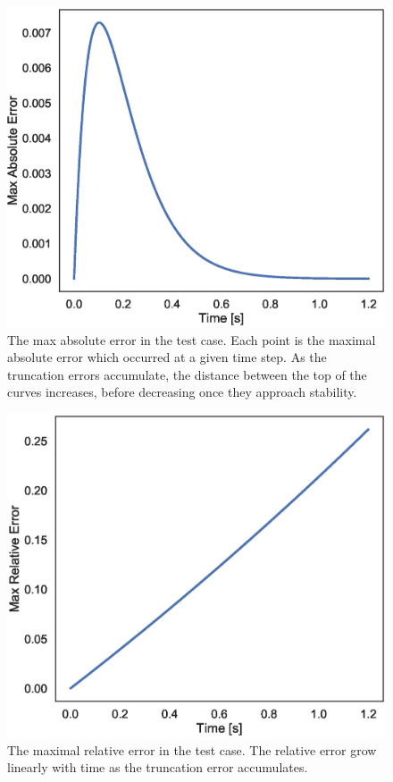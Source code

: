 \documentclass[aps,reprint]{revtex4-1}
\begin{document}
\begin{figure}[ht]
  \centering
  \includegraphics[width=\columnwidth]{figures/sin_absolute_error.eps}
  \caption{\label{fig:sinabserr} The max absolute error in the test case. Each
    point is the maximal absolute error which occurred at a given time step.
    As the truncation errors accumulate, the distance between the top of the
    curves increases, before decreasing once they approach stability. }
\end{figure}
\begin{figure}[ht]
  \centering
  \includegraphics[width=\columnwidth]{figures/sin_relative_error.eps}
  \caption{\label{fig:sinrelerr} The maximal relative error in the test case.
    The relative error grow linearly with time as the truncation error accumulates.}
\end{figure}
\end{document}
